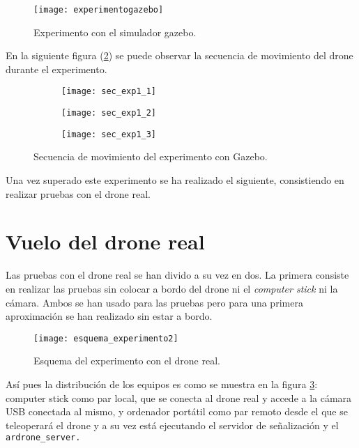 \begin{figure}[h!]
\centering
\texttt{[image: experimentogazebo]}
\caption{Experimento con el simulador gazebo.}
\label{fig:experimentogazebo}
\end{figure}

En la siguiente figura (\ref{fig:secexp1}) se puede observar la secuencia de movimiento del drone durante el experimento.\\
\newpage
\begin{figure}[h!]
\centering
  \begin{subfigure}[]{47mm}
    \texttt{[image: sec\_exp1\_1]}
  \end{subfigure}
  \hspace{0.5pt}
  \begin{subfigure}[]{47mm}
    \texttt{[image: sec\_exp1\_2]}
  \end{subfigure}
    \hspace{0.5pt}
    \begin{subfigure}[]{47mm}
    \texttt{[image: sec\_exp1\_3]}
  \end{subfigure}
    \caption{Secuencia de movimiento del experimento con Gazebo.}
  \label{fig:secexp1}
\end{figure}

Una vez superado este experimento se ha realizado el siguiente, consistiendo en realizar pruebas con el drone real.\\

\section{Vuelo del drone real}

Las pruebas con el drone real se han divido a su vez en dos. La primera consiste en realizar las pruebas sin colocar a bordo del drone ni el \emph{computer stick} ni la cámara. Ambos se han usado para las pruebas pero para una primera aproximación se han realizado sin estar a bordo.\\

\begin{figure}[h!]
\centering
\texttt{[image: esquema\_experimento2]}
\caption{Esquema del experimento con el drone real.}
\label{fig:esquemaexperimento2}
\end{figure}

Así pues la distribución de los equipos es como se muestra en la figura \ref{fig:esquemaexperimento2}: computer stick como par local, que se conecta al drone real y accede a la cámara USB conectada al mismo, y ordenador portátil como par remoto desde el que se teleoperará el drone y a su vez está ejecutando el servidor de señalización y el \texttt{ardrone\_server.}\\

